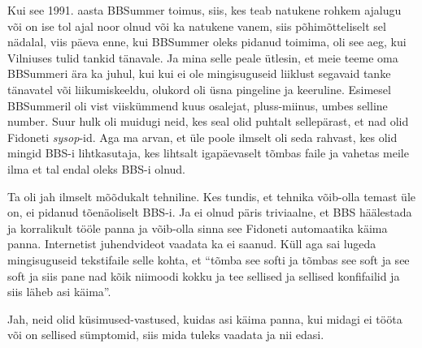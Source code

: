 Kui see 1991. aasta BBSummer toimus, 
 siis, kes teab natukene rohkem ajalugu või 
on ise tol ajal noor olnud või ka natukene vanem, siis põhimõtteliselt sel 
nädalal,  viis päeva enne, kui BBSummer oleks pidanud toimima, oli see aeg, kui 
Vilniuses  tulid tankid tänavale. Ja mina selle peale ütlesin, et  meie teeme 
oma BBSummeri ära ka juhul, kui kui ei ole mingisuguseid liiklust segavaid 
tanke tänavatel või liikumiskeeldu, olukord oli üsna pingeline ja keeruline. Esimesel BBSummeril 
oli vist viiskümmend kuus osalejat, pluss-miinus, umbes selline number. Suur 
hulk oli muidugi neid, kes seal olid puhtalt  sellepärast, et nad olid Fidoneti 
\emph{sysop}-id. Aga ma arvan, et  üle poole ilmselt oli seda rahvast, kes  
olid mingid BBS-i lihtkasutaja, kes lihtsalt igapäevaselt tõmbas faile ja 
vahetas meile ilma et tal endal oleks BBS-i olnud.


Ta oli jah ilmselt mõõdukalt tehniline. Kes tundis, et tehnika võib-olla temast 
üle on, ei pidanud tõenäoliselt BBS-i. Ja ei olnud päris triviaalne, et BBS 
häälestada ja korralikult tööle panna ja võib-olla sinna see Fidoneti 
automaatika käima panna. Internetist juhendvideot vaadata ka ei saanud. Küll 
aga sai lugeda mingisuguseid tekstifaile  selle kohta, et \enquote{tõmba see 
softi ja tõmbas see soft ja see soft ja siis pane nad kõik niimoodi kokku ja  
tee sellised ja sellised konfifailid ja siis läheb asi käima}.


Jah, neid  olid küsimused-vastused, kuidas asi käima panna, kui midagi ei tööta 
või on sellised sümptomid, siis mida tuleks vaadata ja nii edasi.


